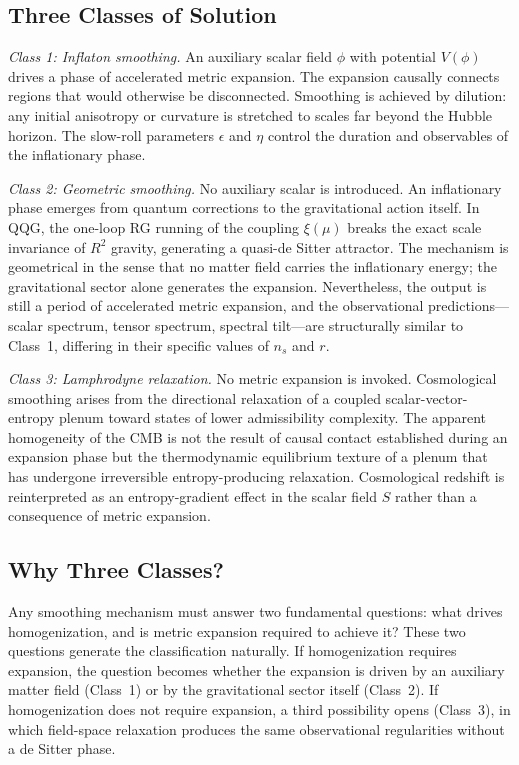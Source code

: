 \documentclass[12pt, a4paper]{article}
\begin{document}
\subsection{Three Classes of Solution}

\textit{Class 1: Inflaton smoothing.} An auxiliary scalar field $\phi$ with
potential $V(\phi)$ drives a phase of accelerated metric expansion. The expansion
causally connects regions that would otherwise be disconnected. Smoothing is
achieved by dilution: any initial anisotropy or curvature is stretched to scales
far beyond the Hubble horizon. The slow-roll parameters $\epsilon$ and $\eta$
control the duration and observables of the inflationary phase.

\textit{Class 2: Geometric smoothing.} No auxiliary scalar is introduced. An
inflationary phase emerges from quantum corrections to the gravitational action
itself. In QQG, the one-loop RG running of the coupling $\xi(\mu)$ breaks the
exact scale invariance of $R^2$ gravity, generating a quasi-de Sitter attractor.
The mechanism is geometrical in the sense that no matter field carries the
inflationary energy; the gravitational sector alone generates the expansion.
Nevertheless, the output is still a period of accelerated metric expansion, and
the observational predictions---scalar spectrum, tensor spectrum, spectral
tilt---are structurally similar to Class~1, differing in their specific values of
$n_s$ and $r$.

\textit{Class 3: Lamphrodyne relaxation.} No metric expansion is invoked.
Cosmological smoothing arises from the directional relaxation of a coupled
scalar-vector-entropy plenum toward states of lower admissibility complexity. The
apparent homogeneity of the CMB is not the result of causal contact established
during an expansion phase but the thermodynamic equilibrium texture of a plenum
that has undergone irreversible entropy-producing relaxation. Cosmological redshift
is reinterpreted as an entropy-gradient effect in the scalar field $S$ rather than
a consequence of metric expansion.

\subsection{Why Three Classes?}

Any smoothing mechanism must answer two fundamental questions: what drives
homogenization, and is metric expansion required to achieve it? These two questions
generate the classification naturally. If homogenization requires expansion, the
question becomes whether the expansion is driven by an auxiliary matter field
(Class~1) or by the gravitational sector itself (Class~2). If homogenization does
not require expansion, a third possibility opens (Class~3), in which field-space
relaxation produces the same observational regularities without a de Sitter phase.
\end{document}
